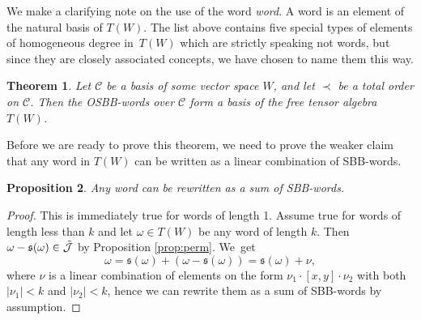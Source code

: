 \documentclass[10pt,a4paper]{amsart}
\newcommand{\s}{\ensuremath{\mathfrak{s}}}
\numberwithin{equation}{section}
\newtheorem{Theorem}{Theorem}[section]
\newtheorem{Proposition}[Theorem]{Proposition}
 { \theoremstyle{definition}
\newtheorem{Definition}[Theorem]{Definition}
\newtheorem{Note}[Theorem]{Note}
\newtheorem{Example}[Theorem]{Example}
\newtheorem{Remark}[Theorem]{Remark} }
\begin{document}
We make a clarifying note on the use of the word \emph{word}. A word is an element of the natural basis of $T(W)$. The list above contains five special types of elements of homogeneous degree in~$T(W)$ which are strictly speaking not words, but since they are closely associated concepts, we have chosen to name them this way. %

\begin{Theorem}\label{th:OSBB}
 Let $\mathcal{C}$ be a basis of some vector space $W$, and let $\prec$ be a total order on $\mathcal{C}$. Then the OSBB-words over $\mathcal{C}$ form a basis of the free tensor algebra $T(W)$.
\end{Theorem}

Before we are ready to prove this theorem, we need to prove the weaker claim that any word in $T(W)$ can be written as a linear combination of SBB-words.


\begin{Proposition}\label{cor:SBB-word}
Any word can be rewritten as a sum of SBB-words.
\end{Proposition}

\begin{proof}
 This is immediately true for words of length 1. Assume true for words of length less than $k$ and let $\omega \in T(W)$ be any word of length $k$. Then $\omega - \s(\omega) \in \Tilde{\mathcal{J}}$ by Proposition \ref{prop:perm}. We~get
 \[
 \omega = \s(\omega) + (\omega - \s(\omega)) = \s(\omega) + \nu,
 \]
 where $\nu$ is a linear combination of elements on the form $\nu_1 \cdot [x,y] \cdot \nu_2$ with both $|\nu_1|<k$ and $|\nu_2|<k$, hence we can rewrite them as a sum of SBB-words by assumption.
\end{proof}
\end{document}
